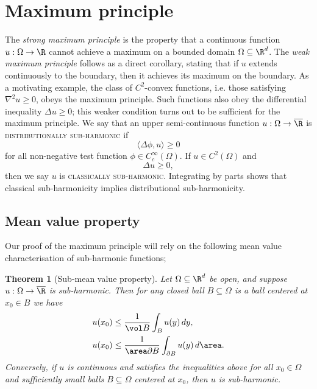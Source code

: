 \documentclass[reqno]{amsart}
\newtheorem{theorem}{Theorem}
\theoremstyle{definition}
\theoremstyle{remark}
\renewcommand{\emph}{\textsc}
\begin{document}
\section{Maximum principle}
\label{sec:max}

The \textit{strong maximum principle} is the property that a continuous function $u : \Omega \to \R$ cannot achieve a maximum on a bounded domain $\Omega \subseteq \R^d$. The \textit{weak maximum principle} follows as a direct corollary, stating that if $u$ extends continuously to the boundary, then it achieves its maximum on the boundary. As a motivating example, the class of $C^2$-convex functions, i.e. those satisfying $\nabla^2 u \geq 0$, obeys the maximum principle. Such functions also obey the differential inequality $\Delta u \geq 0$; this weaker condition turns out to be sufficient for the maximum principle. We say that an upper semi-continuous function $u : \Omega \to \overline \R$ is \emph{distributionally sub-harmonic} if 
	\[ \langle \Delta \phi, u \rangle \geq 0 \]
for all non-negative test function $\phi \in C^\infty_c (\Omega)$. If $u \in C^2 (\Omega)$ and
	\[ \Delta u \geq 0, \]
then we say $u$ is \emph{classically sub-harmonic}. Integrating by parts shows that classical sub-harmonicity implies distributional sub-harmonicity. 

\subsection{Mean value property}

Our proof of the maximum principle will rely on the following mean value characterisation of sub-harmonic functions;

\begin{theorem}[Sub-mean value property]
	Let $\Omega \subseteq \R^d$ be open, and suppose $u : \Omega \to \overline \R$ is sub-harmonic. Then for any closed ball $B \subseteq \Omega$ is a ball centered at $x_0 \in B$ we have
		\begin{align*}
			u(x_0) 
				&\leq \frac{1}{\vol B} \int_B u(y) \, dy, \\
			u(x_0)
				&\leq \frac{1}{\area \partial B} \int_{\partial B} u(y) \, d \area	.
		\end{align*}
	Conversely, if $u$ is continuous and satisfies the inequalities above for all $x_0 \in \Omega$ and sufficiently small balls $B \subseteq \Omega$ centered at $x_0$, then $u$ is sub-harmonic.
\end{theorem}
\end{document}
